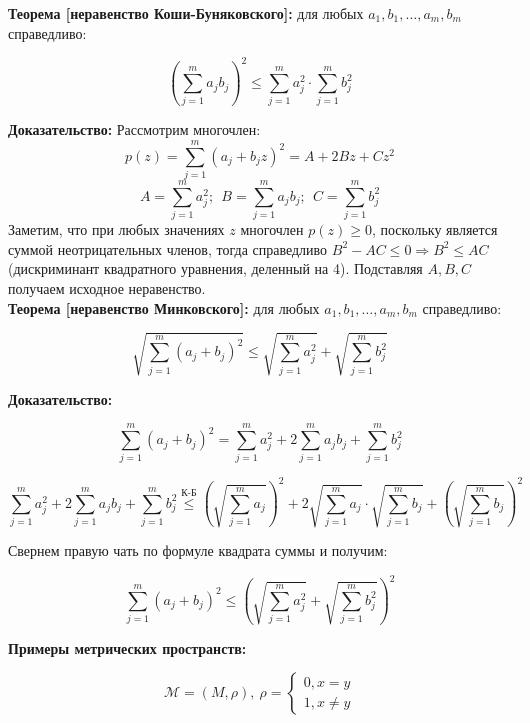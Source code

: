 \documentclass[a4paper,12pt]{article} %
\begin{document}
\noindent \textbf{Теорема [неравенство Коши-Буняковского]:} для любых $a_1, b_1, \dots, a_m, b_m$ справедливо:

\begin{equation*}
    \left( \sum_{j = 1}^{m} a_j b_j \right)^2 \leqslant \sum_{j = 1}^{m} a_j^2 \cdot \sum_{j = 1}^{m} b_j^2
\end{equation*}

\noindent \textbf{Доказательство:} Рассмотрим многочлен:
\[ p(z) = \sum_{j = 1}^{m} (a_j + b_j z)^2 = A + 2Bz + Cz^2 \]
\[ A = \sum_{j = 1}^{m} a_j^2; ~~ B = \sum_{j = 1}^{m} a_j b_j; ~~ C = \sum_{j = 1}^{m} b_j^2 \]
Заметим, что при любых значениях $z$ многочлен $p(z) \geqslant 0$, поскольку является суммой неотрицательных членов, тогда справедливо $B^2 - AC \leqslant 0 \Rightarrow B^2 \leqslant AC$ (дискриминант квадратного уравнения, деленный на 4). Подставляя $A, B, C$ получаем исходное неравенство.\\

\noindent \textbf{Теорема [неравенство Минковского]:} для любых $a_1, b_1, \dots, a_m, b_m$ справедливо:

\begin{equation*}
    \sqrt{\sum_{j = 1}^{m} (a_j + b_j)^2} \leqslant \sqrt{\sum_{j = 1}^{m} a_j^2} + \sqrt{\sum_{j = 1}^{m} b_j^2}
\end{equation*}

\noindent \textbf{Доказательство:} 

\[ \sum_{j = 1}^{m} (a_j + b_j)^2 = \sum_{j = 1}^{m} a_j^2 + 2\sum_{j = 1}^{m} a_j b_j + \sum_{j = 1}^{m} b_j^2 \]

\[ \sum_{j = 1}^{m} a_j^2 + 2\sum_{j = 1}^{m} a_j b_j + \sum_{j = 1}^{m} b_j^2 \stackrel{\text{К-Б}}{\leqslant} \left( \sqrt{\sum_{j = 1}^{m} a_j} \right)^2 + 2\sqrt{\sum_{j = 1}^{m} a_j} \cdot \sqrt{\sum_{j = 1}^{m} b_j} + \left( \sqrt{\sum_{j = 1}^{m} b_j} \right)^2 \]

\noindent Свернем правую чать по формуле квадрата суммы и получим:

\[ \sum_{j = 1}^{m} (a_j + b_j)^2 \leqslant \left( \sqrt{\sum_{j = 1}^{m} a_j^2} + \sqrt{\sum_{j = 1}^{m} b_j^2} \right)^2 \]

\noindent \textbf{Примеры метрических пространств:}

\begin{equation*}
    \mathscr{M} = (M, \rho), ~ \rho = 
    \begin{cases}
        0, x = y\\
        1, x \neq y
    \end{cases}
\end{equation*}
\end{document}
